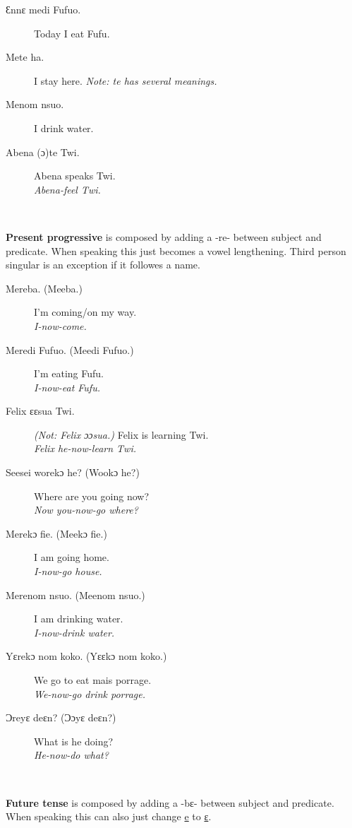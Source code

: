 \documentclass[%
 fontsize=11pt,%
 a5paper,pagesize,
 paper=a5,%
 DIV=9,%
 parskip=half*,%
 twoside=true,
 pointlessnumbers
]{scrbook}%
\begin{document}
\begin{description}
  \item[Ɛnnɛ medi Fufuo.] Today I eat Fufu.
  \item[Mete ha.] I stay here.  \textit{Note: te has several meanings.}
  \item[Menom nsuo.] I drink water.
  \item[Abena (ɔ)te Twi.] Abena speaks Twi. \\
    \textit{Abena-feel Twi.}
\end{description}


~


\textbf{Present progressive} is composed by adding a -re- between subject and predicate. When speaking this just becomes a vowel lengthening. Third person singular is an exception if it followes a name.

\begin{description}
  \item[Mereba. (Meeba.)] I'm coming/on my way. \\
    \textit{I-now-come.}
  \item[Meredi Fufuo. (Meedi Fufuo.)] I'm eating Fufu. \\
    \textit{I-now-eat Fufu.}
  \item[Felix ɛɛsua Twi.] \textit{\footnotesize{(Not: Felix ɔɔsua.)}} Felix is learning Twi. \\
    \textit{Felix he-now-learn Twi.}
  \item[Seesei worekɔ he? (Wookɔ he?)] Where are you going now? \\
    \textit{Now you-now-go where?}
  \item[Merekɔ fie. (Meekɔ fie.)] I am going home. \\
    \textit{I-now-go house.}
  \item[Merenom nsuo. (Meenom nsuo.)] I am drinking water. \\
    \textit{I-now-drink water.}
  \item[Yɛrekɔ nom koko. (Yɛɛkɔ nom koko.)] We go to eat mais porrage. \\
    \textit{We-now-go drink porrage.}
  \item[Ɔreyɛ deɛn? (Ɔɔyɛ deɛn?)] What is he doing? \\
    \textit{He-now-do what?}
\end{description}


~


\textbf{Future tense} is composed by adding a -bɛ- between subject and predicate. When speaking this can also just change \underline{e} to \underline{ɛ}.
\end{document}
